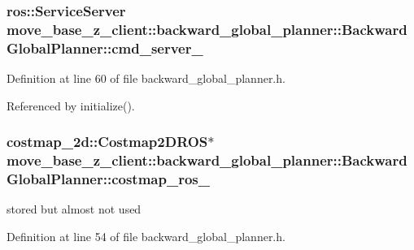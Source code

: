 \subsubsection[{\texorpdfstring{cmd\+\_\+server\+\_\+}{cmd_server_}}]{\setlength{\rightskip}{0pt plus 5cm}ros\+::\+Service\+Server move\+\_\+base\+\_\+z\+\_\+client\+::backward\+\_\+global\+\_\+planner\+::\+Backward\+Global\+Planner\+::cmd\+\_\+server\+\_\+\hspace{0.3cm}{\ttfamily [private]}}\hypertarget{classmove__base__z__client_1_1backward__global__planner_1_1BackwardGlobalPlanner_a470ef57fa2c4caf288ef4ba2934f44e2}{}\label{classmove__base__z__client_1_1backward__global__planner_1_1BackwardGlobalPlanner_a470ef57fa2c4caf288ef4ba2934f44e2}


Definition at line 60 of file backward\+\_\+global\+\_\+planner.\+h.



Referenced by initialize().

\subsubsection[{\texorpdfstring{costmap\+\_\+ros\+\_\+}{costmap_ros_}}]{\setlength{\rightskip}{0pt plus 5cm}costmap\+\_\+2d\+::\+Costmap2\+D\+R\+OS$\ast$ move\+\_\+base\+\_\+z\+\_\+client\+::backward\+\_\+global\+\_\+planner\+::\+Backward\+Global\+Planner\+::costmap\+\_\+ros\+\_\+\hspace{0.3cm}{\ttfamily [private]}}\hypertarget{classmove__base__z__client_1_1backward__global__planner_1_1BackwardGlobalPlanner_ae8c01babf5da5df079840246c34ef1ea}{}\label{classmove__base__z__client_1_1backward__global__planner_1_1BackwardGlobalPlanner_ae8c01babf5da5df079840246c34ef1ea}


stored but almost not used 



Definition at line 54 of file backward\+\_\+global\+\_\+planner.\+h.




